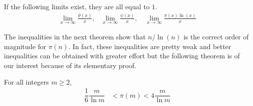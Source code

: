 	\begin{theorem}
		\label{thm:chebyshevestimates}
		If the following limits exist, they are all equal to $1$.
		\begin{align}
			\lim_{x \to \infty} \frac{\vartheta(x)}{x},
				& \lim_{x \to \infty} \frac{\psi(x)}{x}, \quad
			\lim_{x \to \infty} \frac{\pi(x) \ln(x)}{x} \label{eq:chebyshevestimates:eq1}
		\end{align}
	\end{theorem}


The inequalities in the next theorem show that $n/\ln(n)$ is the correct order of magnitude for $\pi(n)$. In fact, these inequalities are pretty weak and better inequalities can be obtained with greater effort but the following theorem is of our interest because of its elementary proof.

	\begin{theorem}
	\label{thm:pi(n)approximation}
		For all integers $m\geq2$,
		\begin{align}
			\dfrac{1}{6}\dfrac{m}{\ln m}
				& <\pi(m)<4\dfrac{m}{\ln m}\label{eq:pi(n)approximation:0}
		\end{align}
	\end{theorem}

